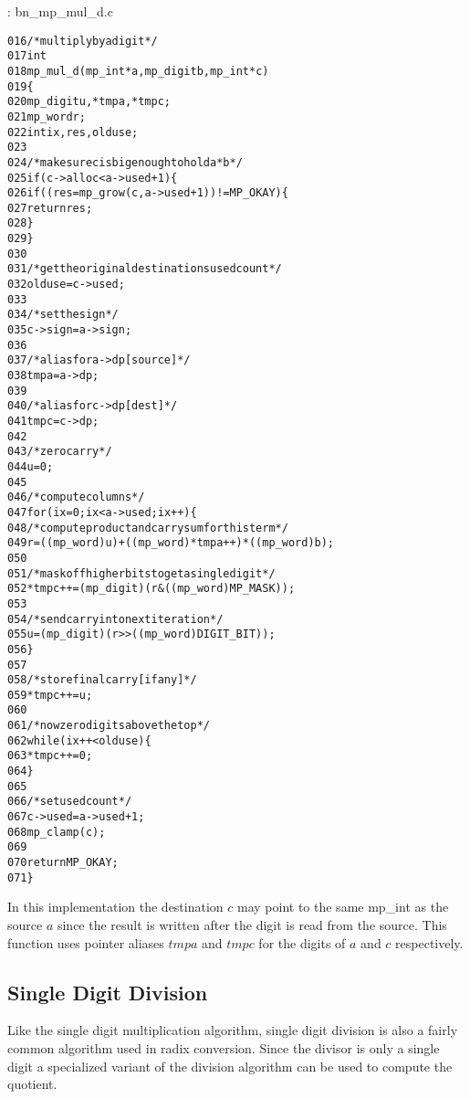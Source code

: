 \documentclass[b5paper]{book}
\begin{document}
\vspace{+3mm}\begin{small}
\hspace{-5.1mm}{\bf File}: bn\_mp\_mul\_d.c
\vspace{-3mm}
\begin{alltt}
016   /* multiply by a digit */
017   int
018   mp_mul_d (mp_int * a, mp_digit b, mp_int * c)
019   \{
020     mp_digit u, *tmpa, *tmpc;
021     mp_word  r;
022     int      ix, res, olduse;
023   
024     /* make sure c is big enough to hold a*b */
025     if (c->alloc < a->used + 1) \{
026       if ((res = mp_grow (c, a->used + 1)) != MP_OKAY) \{
027         return res;
028       \}
029     \}
030   
031     /* get the original destinations used count */
032     olduse = c->used;
033   
034     /* set the sign */
035     c->sign = a->sign;
036   
037     /* alias for a->dp [source] */
038     tmpa = a->dp;
039   
040     /* alias for c->dp [dest] */
041     tmpc = c->dp;
042   
043     /* zero carry */
044     u = 0;
045   
046     /* compute columns */
047     for (ix = 0; ix < a->used; ix++) \{
048       /* compute product and carry sum for this term */
049       r       = ((mp_word) u) + ((mp_word)*tmpa++) * ((mp_word)b);
050   
051       /* mask off higher bits to get a single digit */
052       *tmpc++ = (mp_digit) (r & ((mp_word) MP_MASK));
053   
054       /* send carry into next iteration */
055       u       = (mp_digit) (r >> ((mp_word) DIGIT_BIT));
056     \}
057   
058     /* store final carry [if any] */
059     *tmpc++ = u;
060   
061     /* now zero digits above the top */
062     while (ix++ < olduse) \{
063        *tmpc++ = 0;
064     \}
065   
066     /* set used count */
067     c->used = a->used + 1;
068     mp_clamp(c);
069   
070     return MP_OKAY;
071   \}
\end{alltt}
\end{small}

In this implementation the destination $c$ may point to the same mp\_int as the source $a$ since the result is written after the digit is 
read from the source.  This function uses pointer aliases $tmpa$ and $tmpc$ for the digits of $a$ and $c$ respectively.  

\subsection{Single Digit Division}
Like the single digit multiplication algorithm, single digit division is also a fairly common algorithm used in radix conversion.  Since the
divisor is only a single digit a specialized variant of the division algorithm can be used to compute the quotient.  
\end{document}
